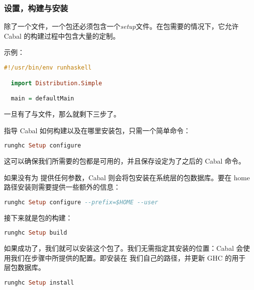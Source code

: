 \documentclass[./main.tex]{subfiles}
\begin{document}
\subsubsection*{设置，构建与安装}

除了一个文件，一个包还必须包含一个\textit{setup}文件。在包需要的情况下，它允许 Cabal 的构建过程中包含大量的定制。

示例：

\begin{lstlisting}[language=Haskell]
  #!/usr/bin/env runhaskell

  import Distribution.Simple

  main = defaultMain
\end{lstlisting}

一旦有了与文件，那么就剩下三步了。

指导 Cabal 如何构建以及在哪里安装包，只需一个简单命令：

\begin{lstlisting}[language=Haskell]
  runghc Setup configure
\end{lstlisting}

这可以确保我们所需要的包都是可用的，并且保存设定为了之后的 Cabal 命令。

如果没有为  提供任何参数，Cabal 则会将包安装在系统层的包数据库。要在 home 路径安装则需要提供一些额外的信息：

\begin{lstlisting}[language=Haskell]
  runghc Setup configure --prefix=$HOME --user
\end{lstlisting}

接下来就是包的构建：

\begin{lstlisting}[language=Haskell]
  runghc Setup build
\end{lstlisting}

如果成功了，我们就可以安装这个包了。我们无需指定其安装的位置：Cabal 会使用我们在步骤中所提供的配置。即安装在
我们自己的路径，并更新 GHC 的用于层包数据库。

\begin{lstlisting}[language=Haskell]
  runghc Setup install
\end{lstlisting}
\end{document}
